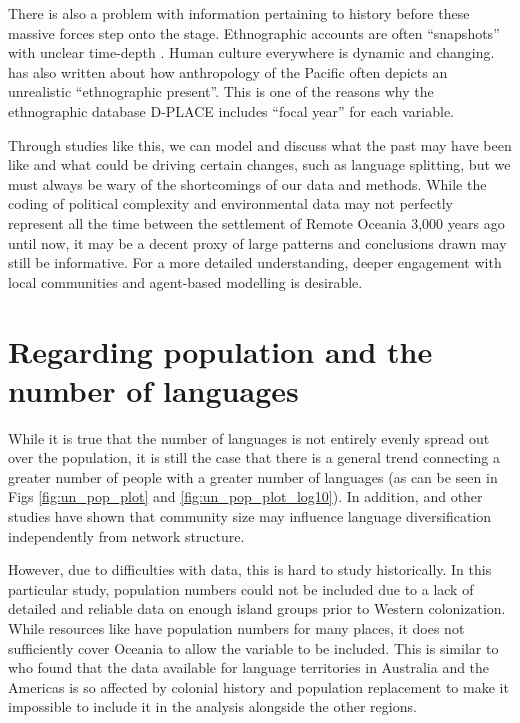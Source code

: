 \documentclass[unnumsec,webpdf,modern,medium]{oup-authoring-template}
\begin{document}
\begin{appendices}
There is also a problem with information pertaining to history before these massive forces step onto the stage. Ethnographic accounts are often ``snapshots'' with unclear time-depth 
 \citep[113]{bedford2008northern}. Human culture everywhere is dynamic and changing. \citet{meleisea1995} has also written about how anthropology of the Pacific often depicts an unrealistic ``ethnographic present''. This is one of the reasons why the ethnographic database D-PLACE \citep{d_place_all} includes ``focal year'' for each variable. 

Through studies like this, we can model and discuss what the past may have been like and what could be driving certain changes, such as language splitting, but we must always be wary of the shortcomings of our data and methods. While the coding of political complexity and environmental data may not perfectly represent all the time between the settlement of Remote Oceania 3,000 years ago until now, it may be a decent proxy of large patterns and conclusions drawn may still be informative. For a more detailed understanding, deeper engagement with local communities and agent-based modelling is desirable.

\section{Regarding population and the number of languages}
\label{appendix_pop_vs_languages}
While it is true that the number of languages is not entirely evenly spread out over the population, it is still the case that there is a general trend connecting a greater number of people with a greater number of languages (as can be seen in Figs \ref{fig:un_pop_plot} and \ref{fig:un_pop_plot_log10}). In addition,  \citet{raviv2019larger} and other studies have shown that community size may influence language diversification independently from network structure. 

However, due to difficulties with data, this is hard to study historically. In this particular study, population numbers could not be included due to a lack of detailed and reliable data on enough island groups prior to Western colonization. While resources like \citet{elcat} have population numbers for many places, it does not sufficiently cover Oceania to allow the variable to be included. This is similar to \citet[7340-7341]{curriemace2009} who found that the data available for language territories in Australia and the Americas is so affected by colonial history and population replacement to make it impossible to include it in the analysis alongside the other regions. 


\end{appendices}
\end{document}

